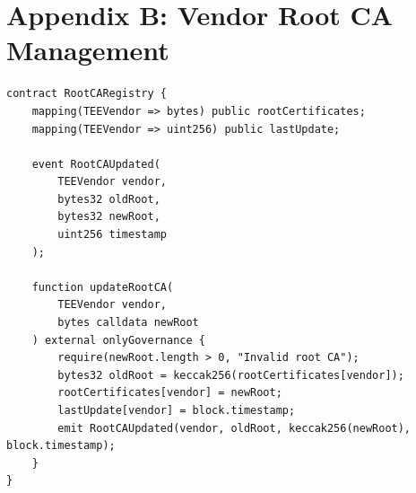 \section{Appendix B: Vendor Root CA Management}


\begin{lstlisting}[language=Solidity, basicstyle=\footnotesize\ttfamily]
contract RootCARegistry {
    mapping(TEEVendor => bytes) public rootCertificates;
    mapping(TEEVendor => uint256) public lastUpdate;
    
    event RootCAUpdated(
        TEEVendor vendor,
        bytes32 oldRoot,
        bytes32 newRoot,
        uint256 timestamp
    );
    
    function updateRootCA(
        TEEVendor vendor,
        bytes calldata newRoot
    ) external onlyGovernance {
        require(newRoot.length > 0, "Invalid root CA");
        bytes32 oldRoot = keccak256(rootCertificates[vendor]);
        rootCertificates[vendor] = newRoot;
        lastUpdate[vendor] = block.timestamp;
        emit RootCAUpdated(vendor, oldRoot, keccak256(newRoot), block.timestamp);
    }
}
\end{lstlisting}

